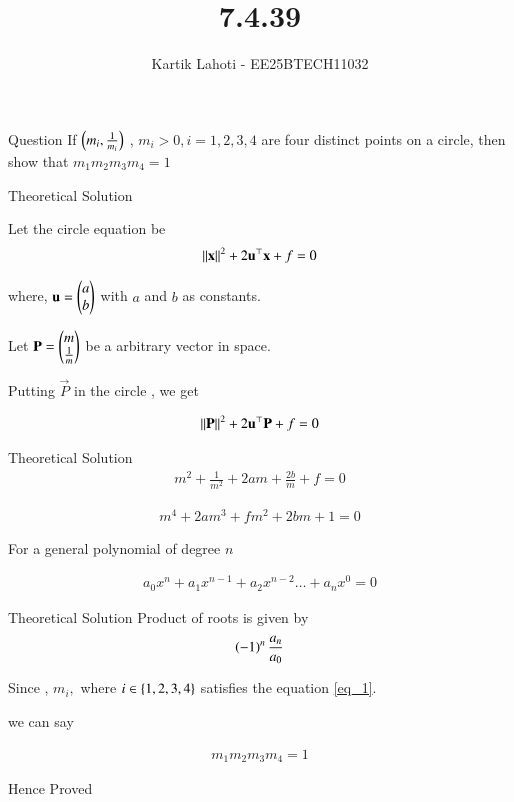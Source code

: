 \documentclass{beamer}
\title %
{7.4.39}
\author 
{Kartik Lahoti - EE25BTECH11032}
\begin{document}
\frame{\titlepage}
\begin{frame}{Question}
If $\left(m_i , \frac{1}{m_i}\right)$ , $m_i > 0 , i = 1, 2,3,4$ are four distinct points on a circle, then show that $m_1m_2m_3m_4 = 1 $
\end{frame}

\begin{frame}{Theoretical Solution}

Let the circle equation be 
\begin{align}
    \left\lVert\mathbf{x}\right\rVert^2 + 2\mathbf{u}^{\top}\mathbf{x} + f = 0 
\end{align}

where, $\mathbf{u} = \begin{pmatrix}a \\ b\end{pmatrix}$ with $a$ and $b$ as constants.

Let $\mathbf{P} = \begin{pmatrix}m \\ \frac{1}{m}\end{pmatrix}$ be a arbitrary vector in space.

Putting $\vec{P}$ in the circle , we get 

\begin{align}
    \left\lVert\mathbf{P}\right\rVert^2 + 2\mathbf{u}^{\top}\mathbf{P} + f = 0 
\end{align}

\end{frame}

\begin{frame}{Theoretical Solution}
\begin{align}
    m^2 + \frac{1}{m^2} + 2am + \frac{2b}{m} + f = 0
\end{align}

\begin{align}
    m^4 + 2am^3 + fm^2 + 2bm + 1 = 0 \label{eq_1}
\end{align}

For a general polynomial of degree $n$

\begin{align}
    a_0x^n + a_1x^{n-1} + a_2x^{n-2} \dots + a_nx^0 = 0  
\end{align}
\end{frame}

\begin{frame}{Theoretical Solution}
Product of roots is given by 
\begin{align}
    \left(-1\right)^n\frac{a_n}{a_0}
\end{align}

Since , $m_i , $ where $ i \in \left\{1,2,3,4\right\} $ satisfies the equation \ref{eq_1}.

we can say 

\begin{align}
    m_1m_2m_3m_4 = 1 
\end{align}

Hence Proved
\end{frame}
\end{document}
